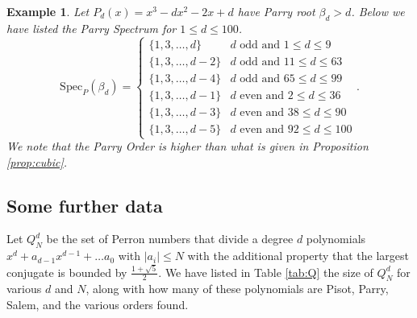 \documentclass[12pt]{article}
\theoremstyle{plain}
\newtheorem{example}[theorem]{Example}
\theoremstyle{remark}
\newcommand{\SpecP}{\mathrm{Spec}_{P}}
\begin{document}
\begin{example}
    Let $P_d(x) = x^3 - d x^2 - 2 x + d$ have Parry root $\beta_d > d$.
Below we have listed the Parry Spectrum for $1 \leq d \leq 100$. 
\[ \SpecP(\beta_d) = \begin{cases}
    \{1, 3, \dots, d\} & d \text{ odd and } 1 \leq d \leq 9 \\
    \{1, 3, \dots, d-2\} & d \text{ odd and } 11 \leq d \leq 63 \\
    \{1, 3, \dots, d-4\} & d \text{ odd and } 65 \leq d \leq 99 \\
    \{1, 3, \dots, d-1\} & d \text{ even and } 2 \leq d \leq 36 \\
    \{1, 3, \dots, d-3\} & d \text{ even and } 38 \leq d \leq 90 \\
    \{1, 3, \dots, d-5\} & d \text{ even and } 92 \leq d \leq 100
\end{cases}.\]
We note that the Parry Order is higher than what is given in Proposition \ref{prop:cubic}.
\end{example}


\subsection{Some further data}
\label{sec:ParryVsNonParry}

Let $Q_N^d$ be the set of Perron numbers that divide a degree $d$ polynomials $x^{d}+ a_{d-1} x^{d-1} + \dots a_0$ with $|a_i| \leq N$ with the additional property that the largest
    conjugate is bounded by $\frac{1+\sqrt{5}}{2}$.
We have listed in Table \ref{tab:Q} the size of $Q^{d}_N$ for various $d$ and $N$, 
    along with how many of these polynomials are Pisot, Parry, Salem, and the various 
    orders found.
    
\end{document}
